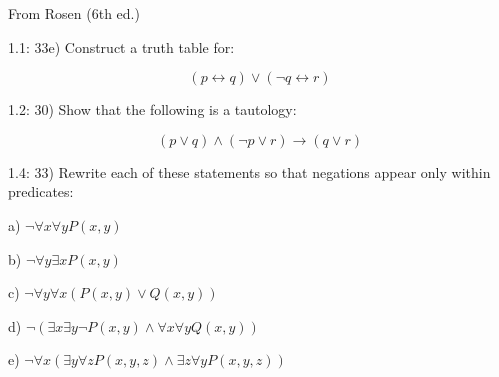 \documentclass[11pt]{article}
\begin{document}
From Rosen (6th ed.)

1.1: 33e) Construct a truth table for:

\[
(p \leftrightarrow q) \vee (\neg q \leftrightarrow r)
\]

1.2: 30) Show that the following is a tautology:

\[
(p \vee q) \wedge (\neg p \vee r) \rightarrow (q \vee r)
\]

1.4: 33) Rewrite each of these statements so that negations appear only within predicates:

a) $ \neg \forall x \forall y P(x,y) $

b) $ \neg \forall y \exists x P(x,y) $

c) $ \neg \forall y \forall x (P(x,y) \vee Q(x,y)) $

d) $ \neg ( \exists x \exists y \neg P(x,y) \wedge \forall x \forall y Q(x,y)) $

e) $ \neg \forall x ( \exists y \forall z P(x,y,z) \wedge \exists z \forall y P(x,y,z)) $
\end{document}
